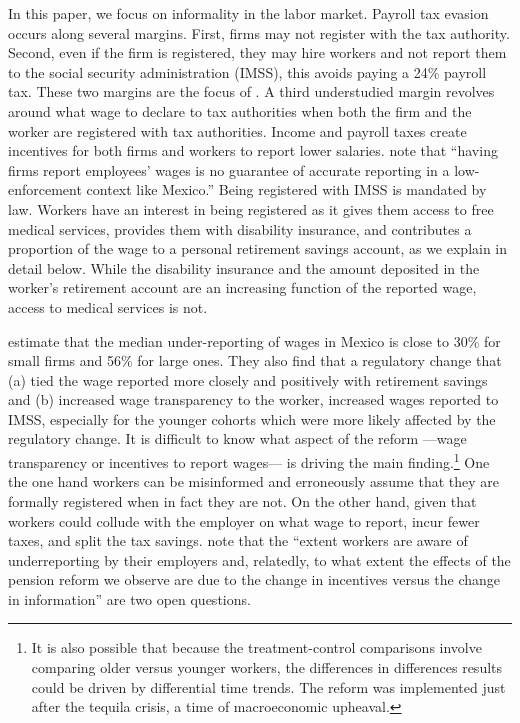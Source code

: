 \documentclass[oneside,11pt]{article}
\begin{document}
In this paper, we focus on informality in the labor market. Payroll tax evasion occurs along several margins. First, firms may not register with the tax authority. Second, even if the firm is registered, they may hire workers and not report them to the social security administration (IMSS), this avoids paying a 24\% payroll tax. These two margins are the focus of \cite{Ulyssea}. A third understudied margin revolves around what wage to declare to tax authorities when both the firm and the worker are registered with tax authorities. Income and payroll taxes create incentives for both firms and workers to report lower salaries. 
\cite{kumler2020enlisting} note that ``having firms report employees’ wages is no guarantee of accurate reporting in a low-enforcement context like Mexico.'' Being registered with IMSS is mandated by law. Workers have an interest in being registered as it gives them access to free medical services, provides them with disability insurance, and contributes a proportion of the wage to a personal retirement savings account, as we explain in detail below. While the disability insurance and the amount deposited in the worker's retirement account are an increasing function of the reported wage, access to medical services is not.

\cite{kumler2020enlisting} estimate that the median under-reporting of wages in Mexico is close to 30\% for small firms and 56\% for large ones. They also find that a regulatory change that (a) tied the wage reported more closely and positively with retirement savings and (b) increased wage transparency to the worker, increased wages reported to IMSS, especially for the younger cohorts which were more likely affected by the regulatory change. %
It is difficult to know what aspect of the reform ---wage transparency or incentives to report wages--- is driving the main finding.\footnote{It is also possible that because the treatment-control comparisons involve comparing older versus younger workers, the differences in differences results could be driven by differential time trends. The reform was implemented just after the tequila crisis, a time of macroeconomic upheaval.} One the one hand workers can be misinformed and erroneously assume that they are formally registered when in fact they are not. On the other hand, given that workers could collude with the employer on what wage to report, incur fewer taxes, and split the tax savings. \cite{kumler2020enlisting} note that the  ``extent workers are aware of underreporting by their employers and, relatedly, to what extent the effects of the pension reform we observe are due to the change in incentives versus the change in information'' are two open questions.  
\end{document}
